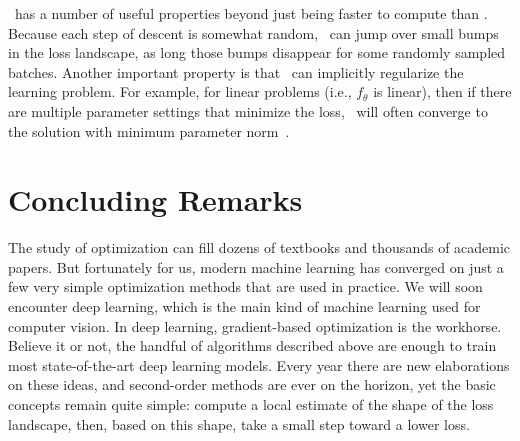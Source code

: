 \SGD~has a number of useful properties beyond just being faster to compute than \GD. Because each step of descent is somewhat random, \SGD~can jump over small bumps in the loss landscape, as long those bumps disappear for some randomly sampled batches. Another important property is that \SGD~can implicitly regularize the learning problem. For example, for linear problems (i.e., $f_\theta$ is linear), then if there are multiple parameter settings that minimize the loss, \SGD~will often converge to the solution with minimum parameter norm~\cite{zhang2021understanding}.



\section{Concluding Remarks}
The study of optimization can fill dozens of textbooks and thousands of academic papers. But fortunately for us, modern machine learning has converged on just a few very simple optimization methods that are used in practice. We will soon encounter deep learning, which is the main kind of machine learning used for computer vision. In deep learning, gradient-based optimization is the workhorse. Believe it or not, the handful of algorithms described above are enough to train most state-of-the-art deep learning models. Every year there are new elaborations on these ideas, and second-order methods are ever on the horizon, yet the basic concepts remain quite simple: compute a local estimate of the shape of the loss landscape, then, based on this shape, take a small step toward a lower loss.
